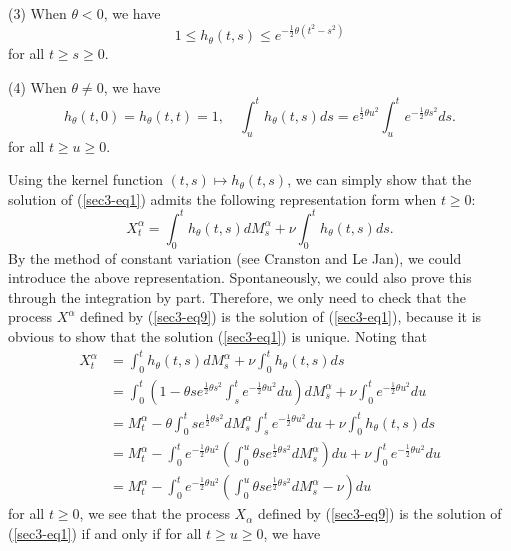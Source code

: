 \documentclass[11pt]{amsart}
\theoremstyle{plain}
\numberwithin{equation}{section}
\begin{document}
(3) When $\theta <0$, we have
\begin{equation*}
1 \leq h_\theta (t,s) \leq e^{-\frac{1}{2}\theta(t^2-s^2)} 
\end{equation*}
for all $t \geq s \geq 0$.

(4) When $\theta \neq 0$, we have 
\begin{equation*}
h_\theta (t,0)=h_\theta (t,t)=1,\quad \int_u^t h_\theta (t,s)ds = e^{\frac{1}{2}\theta u^2 }\int_u^t  e^{-\frac{1}{2}\theta s^2} ds.
\end{equation*}
for all $t \geq u \geq 0$.

Using the kernel function $(t,s)\mapsto h_\theta (t,s)$, we can simply show that the solution of (\ref{sec3-eq1}) admits the following representation form when $t \geq 0$:
\begin{equation}\label{sec3-eq9}
X_t^\alpha = \int_0^t h_\theta(t,s)dM^\alpha_s+\nu \int_0^t h_\theta (t,s)ds.
\end{equation}
By the method of constant variation (see Cranston and Le Jan\cite{Cranston}), we could introduce the above representation. Spontaneously, we could also prove this through the integration by part. Therefore, we only need to check that the process $X^\alpha$ defined by (\ref{sec3-eq9}) is the solution of (\ref{sec3-eq1}), because it is obvious to show that the solution (\ref{sec3-eq1}) is unique. Noting that
\begin{equation*}
\begin{aligned}
X_t^\alpha &= \int_0^t h_\theta(t,s)dM^\alpha_s+\nu \int_0^t h_\theta (t,s)ds\\
& = \int_0^t \left(1-\theta s e^{\frac{1}{2}\theta s^2}\int_s^t e^{-\frac{1}{2}\theta u^2} du\right)dM_s^\alpha+\nu \int_0^t e^{-\frac{1}{2}\theta u^2}du\\
& = M_t^\alpha - \theta \int_0^t se^{\frac{1}{2}\theta s^2}dM_s^\alpha\int_s^t e^{-\frac{1}{2}\theta u^2}du+\nu \int_0^t h_\theta (t,s)ds\\
& = M_t^\alpha - \int_0^t e^{-\frac{1}{2}\theta u^2} \left(\int_0^u \theta se^{\frac{1}{2}\theta s^2}dM_s^\alpha \right)du+ \nu\int_0^t e^{-\frac{1}{2}\theta u^2}du \\
& = M_t^\alpha - \int_0^t e^{-\frac{1}{2}\theta u^2} \left(\int_0^u \theta se^{\frac{1}{2}\theta s^2}dM_s^\alpha -\nu \right)du
\end{aligned}
\end{equation*}
for all $t \geq 0$, we see that the process $X_\alpha$ defined by (\ref{sec3-eq9}) is the solution of (\ref{sec3-eq1}) if and only if for all $ t \geq u \geq 0$, we have 
\end{document}
